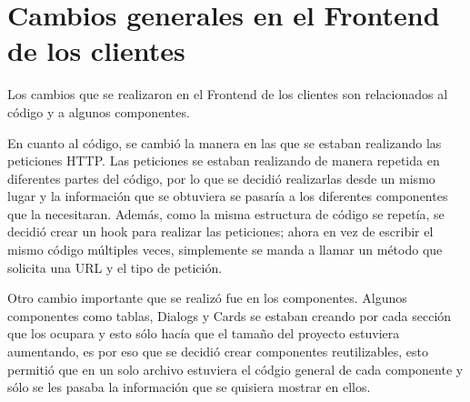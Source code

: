 \section{Cambios generales en el Frontend de los clientes}
Los cambios que se realizaron en el Frontend de los clientes son relacionados al código y a algunos componentes.

En cuanto al código, se cambió la manera en las que se estaban realizando las peticiones HTTP. Las peticiones se estaban realizando de manera repetida en diferentes partes del código, por lo que se decidió realizarlas desde un mismo lugar y la información que se obtuviera se pasaría a los diferentes componentes que la necesitaran. Además, como la misma estructura de código se repetía, se decidió crear un hook para realizar las peticiones; ahora en vez de escribir el mismo código múltiples veces, simplemente se manda a llamar un método que solicita una URL y el tipo de petición.

Otro cambio importante que se realizó fue en los componentes. Algunos componentes como tablas, Dialogs y Cards se estaban creando por cada sección que los ocupara y esto sólo hacía que el tamaño del proyecto estuviera aumentando, es por eso que se decidió crear componentes reutilizables, esto permitió que en un solo archivo estuviera el códgio general de cada componente y sólo se les pasaba la información que se quisiera mostrar en ellos.

